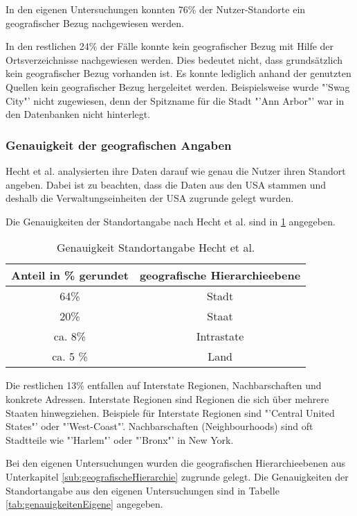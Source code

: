 				In den eigenen Untersuchungen konnten 76\% der Nutzer-Standorte ein geografischer Bezug nachgewiesen werden. 

				In den restlichen 24\% der Fälle konnte kein geografischer Bezug mit Hilfe der Ortsverzeichnisse nachgewiesen werden. 
				Dies bedeutet nicht, dass grundsätzlich kein geografischer Bezug vorhanden ist. 
				Es konnte lediglich anhand der genutzten Quellen kein geografischer Bezug hergeleitet werden.
				Beispielsweise wurde "'Swag City"' nicht zugewiesen, denn der Spitzname für die Stadt "'Ann Arbor"' war in den Datenbanken nicht hinterlegt. 

				
			\subsubsection{Genauigkeit der geografischen Angaben}
				
				Hecht et al. analysierten ihre Daten darauf wie genau die Nutzer ihren Standort angeben.
				Dabei ist zu beachten, dass die Daten aus den USA stammen und deshalb die Verwaltungseinheiten der USA zugrunde gelegt wurden.
				
				Die Genauigkeiten der Standortangabe nach Hecht et al. sind in \ref{tab:genauigkeitenHecht} angegeben. 

				\begin{table}[htpb]
				\caption{Genauigkeit Standortangabe Hecht et al.} 
				\centering
				\begin{tabular}{|c||c|}
					\hline
					Anteil in \% gerundet & geografische Hierarchieebene \\
					\hline\hline
					64\% & Stadt \\
					\hline
					20\% & Staat \\
					\hline
					ca. 8\% & Intrastate \\
					\hline
					ca. 5 \% & Land \\
					\hline
				\end{tabular}
				\label{tab:genauigkeitenHecht} 
				\end{table} 

				Die restlichen 13\% entfallen auf Interstate Regionen, Nachbarschaften und konkrete Adressen. 
				Interstate Regionen sind Regionen die sich über mehrere Staaten hinwegziehen. 
				Beispiele für Interstate Regionen sind "'Central United States"' oder "'West-Coast"'.
				Nachbarschaften (Neighbourhoods) sind oft Stadtteile wie "'Harlem"' oder "'Bronx"' in New York.

				Bei den eigenen Untersuchungen wurden die geografischen Hierarchieebenen aus Unterkapitel \ref{sub:geografischeHierarchie} zugrunde gelegt.
				Die Genauigkeiten der Standortangabe aus den eigenen Untersuchungen sind in Tabelle \ref{tab:genauigkeitenEigene} angegeben.

